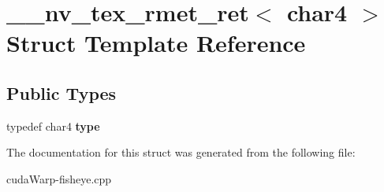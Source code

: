\hypertarget{struct____nv__tex__rmet__ret_3_01char4_01_4}{}\section{\+\_\+\+\_\+nv\+\_\+tex\+\_\+rmet\+\_\+ret$<$ char4 $>$ Struct Template Reference}
\label{struct____nv__tex__rmet__ret_3_01char4_01_4}
\subsection*{Public Types}
\begin{DoxyCompactItemize}
\item 
typedef char4 {\bfseries type}\hypertarget{struct____nv__tex__rmet__ret_3_01char4_01_4_a3a61b51b02e25e213731626cc91e4ee7}{}\label{struct____nv__tex__rmet__ret_3_01char4_01_4_a3a61b51b02e25e213731626cc91e4ee7}

\end{DoxyCompactItemize}


The documentation for this struct was generated from the following file\+:\begin{DoxyCompactItemize}
\item 
cuda\+Warp-\/fisheye.\+cpp\end{DoxyCompactItemize}
